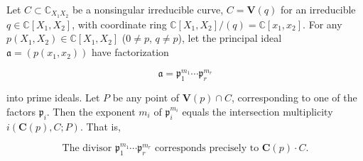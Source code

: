 Let $C \subset \mathbb{C}_{X_1 X_2}$ be a nonsingular irreducible curve, $C = \mathbf{V}(q)$ for an irreducible $q \in \mathbb{C}[X_1, X_2]$, with coordinate ring $\mathbb{C}[X_1, X_2]/(q) = \mathbb{C}[x_1, x_2]$. For any $p(X_1, X_2) \in \mathbb{C}[X_1, X_2]$ ($0 \neq p$, $q \neq p$), let the principal ideal $\mathfrak{a} = (p(x_1, x_2))$ have factorization

$$\mathfrak{a} = \mathfrak{p}_1^{m_1} \cdots \mathfrak{p}_r^{m_r}$$

into prime ideals. Let $P$ be any point of $\mathbf{V}(p) \cap C$, corresponding to one of the factors $\mathfrak{p}_i$. Then the exponent $m_i$ of $\mathfrak{p}_i^{m_i}$ equals the intersection multiplicity $i(\mathbf{C}(p), C; P)$. That is,

$$\text{The divisor } \mathfrak{p}_1^{m_1} \cdots \mathfrak{p}_r^{m_r} \text{ corresponds precisely to } \mathbf{C}(p) \cdot C.$$
